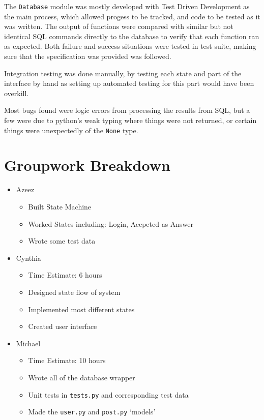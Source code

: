 \documentclass{article}
\begin{document}
The \verb|Database| module was mostly developed with Test Driven Development as the main process, which allowed progess to be tracked, and code to be tested as it was written. The output of functions were compared with similar but not identical SQL commands directly to the database to verify that each function ran as expected. Both failure and success situations were tested in test suite, making sure that the specification was provided was followed.

Integration testing was done manually, by testing each state and part of the interface by hand as setting up automated testing for this part would have been overkill.

Most bugs found were logic errors from processing the results from SQL, but a few were due to python's weak typing where things were not returned, or certain things were unexpectedly of the \verb|None| type.

\section{Groupwork Breakdown}

\begin{itemize}
    \item Azeez
          \begin{itemize}
              \item Built State Machine
              \item Worked States including: Login, Accpeted as Answer
              \item Wrote some test data
          \end{itemize}
    \item Cynthia
          \begin{itemize}
              \item Time Estimate: 6 hours
              \item Designed state flow of system
              \item Implemented most different states
              \item Created user interface
          \end{itemize}
    \item Michael
          \begin{itemize}
              \item Time Estimate: 10 hours
              \item Wrote all of the database wrapper
              \item Unit tests in \verb|tests.py| and corresponding test data
              \item Made the \verb|user.py| and \verb|post.py| `models'
          \end{itemize}
\end{itemize}




\end{document}

